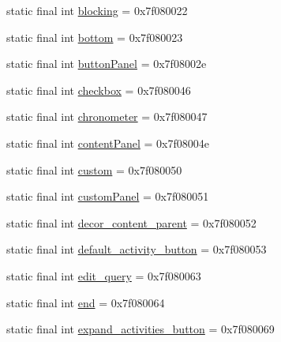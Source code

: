 \begin{DoxyCompactItemize}
\item 
static final int \mbox{\hyperlink{classandroid_1_1support_1_1v7_1_1appcompat_1_1_r_1_1id_aa1bc1c04592e5c26afa5583106c64884}{blocking}} = 0x7f080022
\item 
static final int \mbox{\hyperlink{classandroid_1_1support_1_1v7_1_1appcompat_1_1_r_1_1id_a39ef8df7a7aa59f18001c013bf910ed7}{bottom}} = 0x7f080023
\item 
static final int \mbox{\hyperlink{classandroid_1_1support_1_1v7_1_1appcompat_1_1_r_1_1id_a54c250694e2e32d9d0bffc4eb06c2a7c}{button\+Panel}} = 0x7f08002e
\item 
static final int \mbox{\hyperlink{classandroid_1_1support_1_1v7_1_1appcompat_1_1_r_1_1id_ace6d05a8aeb5fac518dcec95ece0b4c2}{checkbox}} = 0x7f080046
\item 
static final int \mbox{\hyperlink{classandroid_1_1support_1_1v7_1_1appcompat_1_1_r_1_1id_afb6264939cc20738a3bda59526ecfdc6}{chronometer}} = 0x7f080047
\item 
static final int \mbox{\hyperlink{classandroid_1_1support_1_1v7_1_1appcompat_1_1_r_1_1id_a7ca9a7024cb6cfea705fe251a7e4a3ab}{content\+Panel}} = 0x7f08004e
\item 
static final int \mbox{\hyperlink{classandroid_1_1support_1_1v7_1_1appcompat_1_1_r_1_1id_a42c3f8858afe9accbfb229c5a0470024}{custom}} = 0x7f080050
\item 
static final int \mbox{\hyperlink{classandroid_1_1support_1_1v7_1_1appcompat_1_1_r_1_1id_a4f4e1a3faa478db1183ae51c17dcff31}{custom\+Panel}} = 0x7f080051
\item 
static final int \mbox{\hyperlink{classandroid_1_1support_1_1v7_1_1appcompat_1_1_r_1_1id_aea0320decb2f530b61643c8b8398f559}{decor\+\_\+content\+\_\+parent}} = 0x7f080052
\item 
static final int \mbox{\hyperlink{classandroid_1_1support_1_1v7_1_1appcompat_1_1_r_1_1id_a744e60e505fa071f1cc339c813393086}{default\+\_\+activity\+\_\+button}} = 0x7f080053
\item 
static final int \mbox{\hyperlink{classandroid_1_1support_1_1v7_1_1appcompat_1_1_r_1_1id_af94f57ae49bc17ea306089567ef89794}{edit\+\_\+query}} = 0x7f080063
\item 
static final int \mbox{\hyperlink{classandroid_1_1support_1_1v7_1_1appcompat_1_1_r_1_1id_aac9afcc19f505681aa88202a7b27d31e}{end}} = 0x7f080064
\item 
static final int \mbox{\hyperlink{classandroid_1_1support_1_1v7_1_1appcompat_1_1_r_1_1id_a322929fd47d9215e3b10b62d3762f5eb}{expand\+\_\+activities\+\_\+button}} = 0x7f080069

\end{DoxyCompactItemize}
